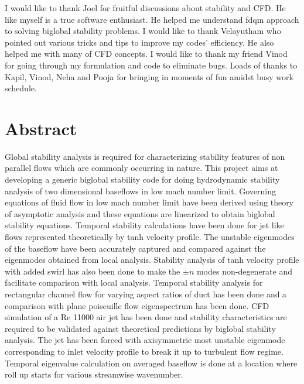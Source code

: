 \documentclass[pdftex,12pt,a4paper,oneside]{report}
\begin{document}
I would like to thank Joel for fruitful discussions about stability and CFD. He like myself is a true software enthusiast. 
He helped me understand fdqm approach to solving biglobal stability problems. I would like to thank Velayutham who pointed 
out various tricks and tips to improve my codes' efficiency. He also helped me with many of CFD concepts. I would like to
thank my friend Vinod for going through my formulation and code to eliminate bugs. Loads of thanks to Kapil, Vinod, Neha and Pooja for bringing in moments of fun amidst busy work schedule.
\newpage


\chapter*{\huge Abstract}


\hspace{1.00cm}Global stability analysis is required for characterizing stability features of non parallel flows which 
are commonly occurring in nature. This project aims at developing a generic biglobal stability code for doing hydrodynamic stability analysis of two dimensional
baseflows in low mach number limit.  Governing equations of fluid flow in low mach number limit have been
derived using theory of asymptotic analysis and these equations are linearized to obtain biglobal stability
equations. Temporal stability calculations have been done for jet like flows represented theoretically by tanh 
velocity profile. The unstable eigenmodes of the baseflow have been accurately captured and compared against the
eigenmodes obtained from local analysis. Stability analysis of tanh velocity profile with added swirl has also been
done to make the $\pm n$ modes non-degenerate and facilitate comparison with local analysis. 
Temporal stability analysis for rectangular channel flow for varying aspect ratios of duct has been done and a comparison with plane poiseuille flow eigenspectrum has been done.
CFD simulation of a Re 11000 air jet has been done and stability characteristics are required to be validated against
theoretical predictions by biglobal stability analysis. The jet has been forced with axisymmetric most unstable
eigenmode corresponding to inlet velocity profile to break it up to turbulent flow regime. Temporal eigenvalue calculation on averaged baseflow is done at a location where roll up starts for various streamwise wavenumber.
\newpage
\end{document}
